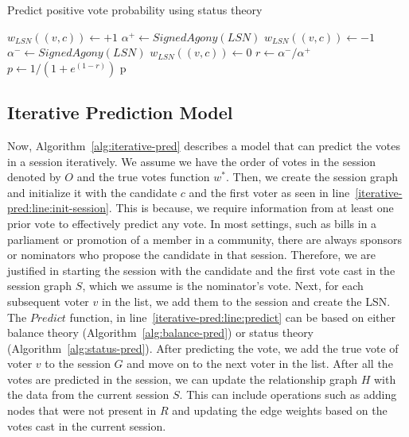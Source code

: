 \begin{algorithm}[htp]
    \DontPrintSemicolon
    \caption{Predict positive vote probability using status theory}
    \label{alg:status-pred}
    $w_{LSN}((v,c)) \leftarrow +1$ 
    $\alpha^+ \leftarrow SignedAgony(LSN)$\;
    $w_{LSN}((v,c)) \leftarrow -1$  
    $\alpha^- \leftarrow SignedAgony(LSN)$\;
    $w_{LSN}((v,c)) \leftarrow 0$ 
    $r \leftarrow {\alpha^-}/{\alpha^{+}}$\;
    $p \leftarrow 1/(1+e^{(1-r)})$\;
    \Return p
\end{algorithm}




\subsection{Iterative Prediction Model}

Now, Algorithm~\ref{alg:iterative-pred} describes a model that can predict the votes in a session iteratively.
We assume we have the order of votes in the session denoted by $O$ and the true votes function $w^{*}$.
Then, we create the session graph and initialize it with the candidate $c$ and the first voter as seen in line~\ref{iterative-pred:line:init-session}.
This is because, we require information from at least one prior vote to effectively predict any vote.
In most settings, such as bills in a parliament or promotion of a member in a community, there are always sponsors or nominators who propose the candidate in that session.
Therefore, we are justified in starting the session with the candidate and the first vote cast in the session graph $S$, which we assume is the nominator's vote.
Next, for each subsequent voter $v$ in the list, we add them to the session and create the LSN.
The $Predict$ function, in line~\ref{iterative-pred:line:predict} can be based on either balance theory (Algorithm~\ref{alg:balance-pred}) or status theory (Algorithm~\ref{alg:status-pred}).
After predicting the vote, we add the true vote of voter $v$ to the session $G$ and move on to the next voter in the list.
After all the votes are predicted in the session, we can update the relationship graph $H$ with the data from the current session $S$.
This can include operations such as adding nodes that were not present in $R$ and updating the edge weights based on the votes cast in the current session.

